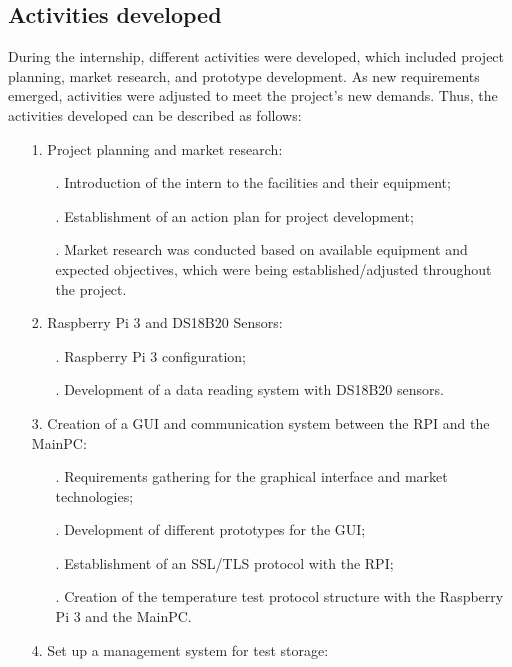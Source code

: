 \subsection{Activities developed}

During the internship, different activities were developed, which included project planning, market research, and prototype development. As new requirements emerged, activities were adjusted to meet the project's new demands. Thus, the activities developed can be described as follows:

\begin{itemize}
    \item[] 1. Project planning and market research:
        \begin{itemize}
            \item[.] Introduction of the intern to the facilities and their equipment;
            \item[.] Establishment of an action plan for project development;
            \item[.] Market research was conducted based on available equipment and expected objectives, which were being established/adjusted throughout the project.
        \end{itemize}
    \item[] 2. Raspberry Pi 3 and DS18B20 Sensors:
        \begin{itemize}
            \item[.] Raspberry Pi 3 configuration;
            \item[.] Development of a data reading system with DS18B20 sensors.
        \end{itemize}
    \item[] 3. Creation of a GUI and communication system between the RPI and the MainPC: 
        \begin{itemize}
            \item[.] Requirements gathering for the graphical interface and market technologies;
            \item[.] Development of different prototypes for the GUI;
            \item[.] Establishment of an SSL/TLS protocol with the RPI;
            \item[.] Creation of the temperature test protocol structure with the Raspberry Pi 3 and the MainPC.
        \end{itemize}
    \item[] 4. Set up a management system for test storage:
        \begin{itemize}

\end{itemize}
\end{itemize}
